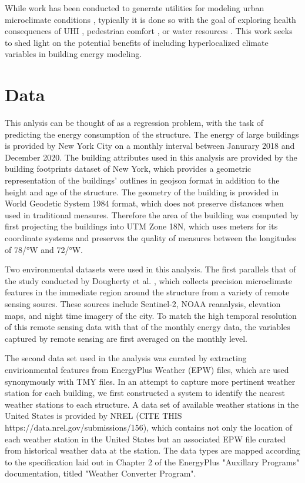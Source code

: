 \documentclass[preprint,review,12pt]{elsarticle}
\begin{document}
\begin{linenumbers}
While work has been conducted to generate utilities for modeling urban microclimate conditions \cite{kusaka_simple_2001}\cite{bueno_urban_2013}\cite{romero_rodriguez_urban-scale_2020}, typically it is done so with the goal of exploring health consequences of UHI \cite{hsu_disproportionate_2021}, pedestrian comfort \cite{allegrini_influence_2015}, or water resources \cite{de_ridder_urbclim_2015}. This work seeks to shed light on the potential benefits of including hyperlocalized climate variables in building energy modeling.

\section{Data}
This anlysis can be thought of as a regression problem, with the task of predicting the energy consumption of the structure. The energy of large buildings is provided by New York City on a monthly interval between Janurary 2018 and December 2020. The building attributes used in this analysis are provided by the building footprints dataset of New York, which provides a geometric representation of the buildings' outlines in geojson format in addition to the height and age of the structure. The geometry of the building is provided in World Geodetic System 1984 format, which does not preserve distances when used in traditional measures. Therefore the area of the building was computed by first projecting the buildings into UTM Zone 18N, which uses meters for its coordinate systems and preserves the quality of measures between the longitudes of 78/°W and 72/°W.

Two environmental datasets were used in this analysis. The first parallels that of the study conducted by Dougherty et al. \cite{}, which collects precision microclimate features in the immediate region around the structure from a variety of remote sensing sourcs. These sources include Sentinel-2, NOAA reanalysis, elevation maps, and night time imagery of the city. To match the high temporal resolution of this remote sensing data with that of the monthly energy data, the variables captured by remote sensing are first averaged on the monthly level. 

The second data set used in the analysis was curated by extracting envirionmental features from EnergyPlus Weather (EPW) files, which are used synonymously with TMY files. In an attempt to capture more pertinent weather station for each building, we first constructed a system to identify the nearest weather stations to each structure. A data set of available weather stations in the United States is provided by NREL (CITE THIS https://data.nrel.gov/submissions/156), which contains not only the location of each weather station in the United States but an associated EPW file curated from historical weather data at the station. The data types are mapped according to the specification laid out in Chapter 2 of the EnergyPlus "Auxillary Programs" documentation, titled "Weather Converter Program".


\end{linenumbers}
\end{document}
